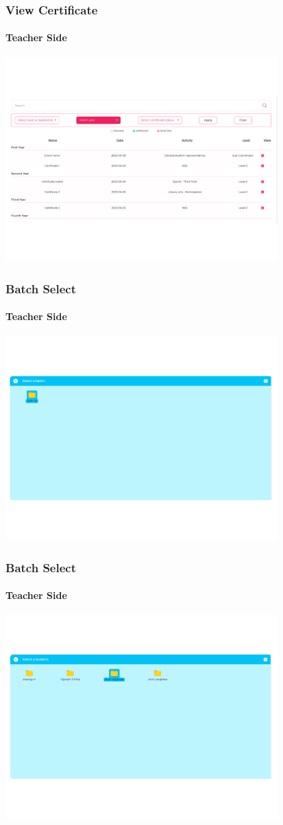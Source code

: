 \begin{frame}
  \frametitle{View Certificate }
   \framesubtitle{Teacher Side }
\centering
{\includegraphics[width=10.5cm]{teacher_certificates_view.png}}
\end{frame}

\begin{frame}
  \frametitle{Batch Select }
   \framesubtitle{Teacher Side}
\centering
{\includegraphics[width=10.5cm]{bacth_select1.png}}
\end{frame}

\begin{frame}
  \frametitle{Batch Select }
   \framesubtitle{Teacher Side}
\centering
{\includegraphics[width=10.5cm]{batch_select2.png}}
\end{frame}